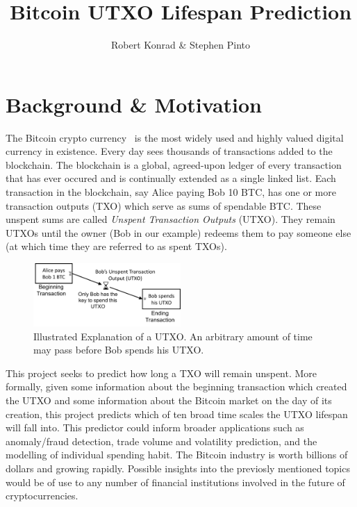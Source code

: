 \documentclass[11pt]{article}
\title{Bitcoin UTXO Lifespan Prediction}
\author{Robert Konrad \& Stephen Pinto}
\begin{document}
\maketitle

\section{Background \& Motivation}
The Bitcoin crypto currency~\cite{Na:08,NBF:15} is the most widely used and highly valued digital currency in existence. Every day sees thousands of transactions added to the blockchain. The blockchain is a global, agreed-upon ledger of every transaction that has ever occured and is continually extended as a single linked list. Each transaction in the blockchain, say Alice paying Bob 10 BTC, has one or more transaction outputs (TXO) which serve as sums of spendable BTC. These unspent sums are called \emph{Unspent Transaction Outputs} (UTXO). They remain UTXOs until the owner (Bob in our example) redeems them to pay someone else (at which time they are referred to as spent TXOs).

\begin{figure}
\begin{center}
\includegraphics[width=0.5\textwidth]{figures/utxo}
\end{center}
\caption{Illustrated Explanation of a UTXO. An arbitrary amount of time may pass before Bob spends his UTXO.}
\label{utxo}
\end{figure}

This project seeks to predict how long a TXO will remain unspent. More formally, given some information about the beginning transaction which created the UTXO and some information about the Bitcoin market on the day of its creation, this project predicts which of ten broad time scales the UTXO lifespan will fall into. This predictor could inform broader applications such as anomaly/fraud detection, trade volume and volatility prediction, and the modelling of individual spending habit. The Bitcoin industry is worth billions of dollars and growing rapidly. Possible insights into the previosly mentioned topics would be of use to any number of financial institutions involved in the future of cryptocurrencies. 
\end{document}

